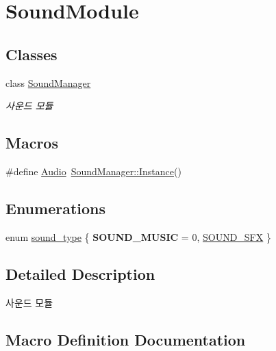 \hypertarget{group___sound_module}{}\section{Sound\+Module}
\label{group___sound_module}
\subsection*{Classes}
\begin{DoxyCompactItemize}
\item 
class \mbox{\hyperlink{class_sound_manager}{Sound\+Manager}}
\begin{DoxyCompactList}\small\item\em 사운드 모듈 \end{DoxyCompactList}\end{DoxyCompactItemize}
\subsection*{Macros}
\begin{DoxyCompactItemize}
\item 
\#define \mbox{\hyperlink{group___sound_module_ga08e93d758d33fb8769fcac805894adb3}{Audio}}~\mbox{\hyperlink{class_sound_manager_a9cf8d653de9d00018fdd646654d2024b}{Sound\+Manager\+::\+Instance}}()
\end{DoxyCompactItemize}
\subsection*{Enumerations}
\begin{DoxyCompactItemize}
\item 
enum \mbox{\hyperlink{group___sound_module_gadfb4b3d4c43f1e78a1e95150ca37fd1e}{sound\+\_\+type}} \{ {\bfseries S\+O\+U\+N\+D\+\_\+\+M\+U\+S\+IC} = 0, 
\mbox{\hyperlink{group___sound_module_ggadfb4b3d4c43f1e78a1e95150ca37fd1eaaa0a70ddaa3102f56f8aa3c334f8f8b1}{S\+O\+U\+N\+D\+\_\+\+S\+FX}}
 \}
\end{DoxyCompactItemize}


\subsection{Detailed Description}
사운드 모듈 

\subsection{Macro Definition Documentation}
\mbox{\label{group___sound_module_ga08e93d758d33fb8769fcac805894adb3}} 
